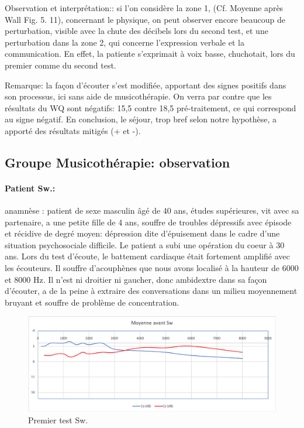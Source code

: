 Observation et interprétation:: si l'on considère la zone 1, (Cf. Moyenne après Wall Fig. 5. 11),  concernant 
le 
physique, on 
peut observer 
encore beaucoup de 
perturbation, visible avec la chute des décibels lors du second test,  et une perturbation dans la zone 2, 
qui concerne l'expression verbale et la communication. En effet, la patiente s'exprimait  à voix basse, 
chuchotait, lors du premier comme du second test.


Remarque: la façon d'écouter s'est modifiée, apportant des signes positifs dans son processus,  ici sans 
aide de musicothérapie. On verra par contre que les résultats du WQ sont négatifs: 15,5 contre 18,5 
pré-traitement, ce qui
correspond au signe négatif.
En conclusion, le séjour, trop bref selon notre hypothèse, a apporté des résultats mitigés (+ et -). 
\clearpage


\subsection*{Groupe Musicothérapie: observation}

\paragraph{ Patient Sw.:} anamnèse : patient de sexe masculin âgé de 40 ans, études supérieures, vit 
avec sa partenaire, a une petite fille de 4 ans, souffre de troubles dépressifs avec épisode et récidive de 
degré moyen: dépression dite d'épuisement dans le cadre d'une situation psychosociale difficile.
Le patient a subi une opération du coeur à 30 ans. Lors du test d'écoute, le battement  cardiaque était 
fortement amplifié avec les écouteurs. Il souffre d'acouphènes que nous avons localisé à la hauteur de 
6000 
et 8000 Hz. Il n'est ni droitier ni gaucher, donc ambidextre dans sa façon d'écouter, a de la peine à 
extraire 
des conversations dans un milieu moyennement bruyant et souffre de problème de concentration.



 \begin{figure}[th]
\centering
\includegraphics[width=1\linewidth]{images/graphiques/sw_pre.png}
\caption[ \textbf{Groupe Musicothérapie}: Patient Sw. : 1°Test]{Premier test Sw.}

\end{figure}

